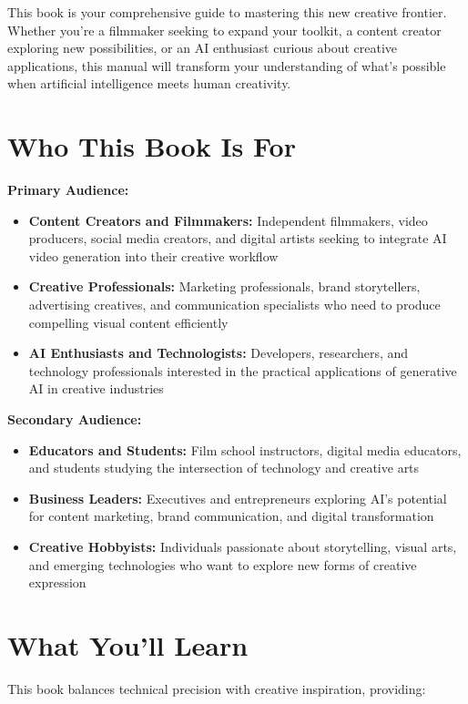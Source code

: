 \documentclass[11pt,letterpaper]{book}
\begin{document}
This book is your comprehensive guide to mastering this new creative frontier. Whether you're a filmmaker seeking to expand your toolkit, a content creator exploring new possibilities, or an AI enthusiast curious about creative applications, this manual will transform your understanding of what's possible when artificial intelligence meets human creativity.

\section*{Who This Book Is For}

\textbf{Primary Audience:}
\begin{itemize}
\item \textbf{Content Creators and Filmmakers:} Independent filmmakers, video producers, social media creators, and digital artists seeking to integrate AI video generation into their creative workflow
\item \textbf{Creative Professionals:} Marketing professionals, brand storytellers, advertising creatives, and communication specialists who need to produce compelling visual content efficiently
\item \textbf{AI Enthusiasts and Technologists:} Developers, researchers, and technology professionals interested in the practical applications of generative AI in creative industries
\end{itemize}

\textbf{Secondary Audience:}
\begin{itemize}
\item \textbf{Educators and Students:} Film school instructors, digital media educators, and students studying the intersection of technology and creative arts
\item \textbf{Business Leaders:} Executives and entrepreneurs exploring AI's potential for content marketing, brand communication, and digital transformation
\item \textbf{Creative Hobbyists:} Individuals passionate about storytelling, visual arts, and emerging technologies who want to explore new forms of creative expression
\end{itemize}

\section*{What You'll Learn}

This book balances technical precision with creative inspiration, providing:
\end{document}
